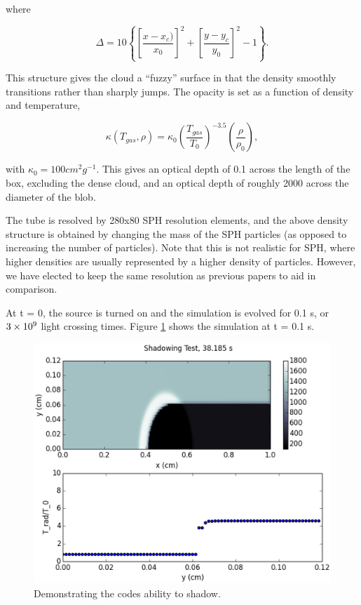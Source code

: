 where

\begin{equation}
\label{eq:shadowdelta}
\Delta = 10\left\lbrace\left[\frac{x-x_c)}{x_0}\right]^2 + \left[\frac{y-y_c}{y_0}\right]^2-1\right\rbrace.
\end{equation}

This structure gives the cloud a ``fuzzy'' surface in that the density smoothly transitions rather than sharply jumps. The opacity is set as a function of density and temperature,

\begin{equation}
\label{eq:shadowopacity}
\kappa(T_{gas},\rho) = \kappa_0\left(\frac{T_{gas}}{T_0}\right)^{-3.5}\left(\frac{\rho}{\rho_0}\right),
\end{equation}

with $\kappa_0 = 100 cm^2 g^{-1}$. This gives an optical depth of 0.1 across the length of the box, excluding the dense cloud, and an optical depth of roughly 2000 across the diameter of the blob.

The tube is resolved by 280x80 SPH resolution elements, and the above density structure is obtained by changing the mass of the SPH particles (as opposed to increasing the number of particles). Note that this is not realistic for SPH, where higher densities are usually represented by a higher density of particles. However, we have elected to keep the same resolution as previous papers to aid in comparison.

At t = 0, the source is turned on and the simulation is evolved for 0.1 s, or $3\times 10^{9}$ light crossing times. Figure \ref{fig:shadow} shows the simulation at t = 0.1 s.

\begin{figure}
\includegraphics[width=\textwidth]{graphics/shadow10000.eps}
\caption[Shadowing.]{Demonstrating the codes ability to shadow.}
\label{fig:shadow}
\end{figure}

